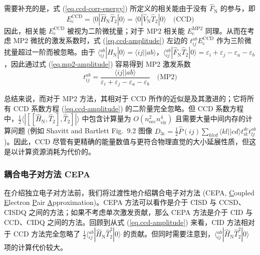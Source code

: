 \begin{itemize}[nosep]
  需要补充的是，式 (\ref{eq.ccd-corr-energy}) 所定义的相关能由于没有 $\hat F_\mathrm{N}$ 的参与，即
  \begin{equation*}
    E_\mathrm{c}^\mathrm{CCD} = \langle 0 | \hat H_\mathrm{N} \hat T_2 | 0 \rangle = \langle 0 | \hat V_\mathrm{N} \hat T_2 | 0 \rangle \quad \text{(CCD)}
  \end{equation*}
  因此，相关能 $E_\mathrm{c}^\mathrm{CCD}$ 被视为二阶微扰量；对于 MP2 相关能 $E_\mathrm{c}^\mathrm{MP2}$ 同理。从而在考虑 MP2 微扰的激发系数时，式 (\ref{eq.ccd-amplitude}) 左边的 $t_{ij}^{ab} E_\mathrm{c}^\mathrm{CCD}$ 作为三阶微扰量超过一阶而被忽略。由于 $\langle {}_{ij}^{ab} | \hat H_\mathrm{N} | 0 \rangle = \langle ij || ab \rangle$，$\langle {}_{ij}^{ab} | \hat F_\mathrm{N} \hat T_2 | 0 \rangle = \varepsilon_i + \varepsilon_j - \varepsilon_a - \varepsilon_b$，因此通过式 (\ref{eq.mp2-amplitude}) 容易得到 MP2 激发系数
  \begin{equation}
    t_{ij}^{ab} = \frac{\langle ij || ab \rangle}{\varepsilon_i + \varepsilon_j - \varepsilon_a - \varepsilon_b} \quad \text{(MP2)}
  \end{equation}
\end{itemize}

总结来说，而对于 MP2 方法，其相对于 CCD 所作的近似是及其激进的；它将所有 CCD 系数方程 (\ref{eq.ccd-amplitude}) 的二阶量完全忽略。但 CCD 系数方程中，$\frac{1}{2} \langle | [[\hat H_\mathrm{N}, \hat T_2], \hat T_2] | \rangle$ 中包含计算量为 $O(n_\mathrm{occ}^2 n_\mathrm{vir}^4)$ 且需要大量中间内存的计算问题 (例如 Shavitt and Bartlett\cite{Shavitt-Bartlett.Cambridge.2009} Fig.\ 9.2 图像 $D_\mathrm{3c} = \frac{1}{2} \hat P(ij) \sum_{klcd} \langle kl || cd \rangle t_{ik}^{dc} t_{lj}^{ab}$)。因此，CCD 尽管有更精确的能量数值与更符合物理直觉的大小延展性质，但这是以计算资源消耗为代价的。
  
\subsubsection{耦合电子对方法 CEPA}

在介绍独立电子对方法前，我们将过渡性地介绍耦合电子对方法 (CEPA, \underline{C}oupled \underline{E}lectron \underline{P}air \underline{A}pproximation)\cite{Ahlrichs-Ahlrichs.CPC.1979}。CEPA 方法可以看作是介于 CISD 与 CCSD、CISDQ 之间的方法；如果不考虑单次激发贡献，那么 CEPA 方法是介于 CID 与 CCD、CIDQ 之间的方法。回顾到从式 (\ref{eq.ccd-amplitude}) 来看，CID 方法相对于 CCD 方法完全忽略了 $\frac{1}{2} \langle {}_{ij}^{ab} | \hat H_\mathrm{N} \hat T_2^2 | 0 \rangle$ 的贡献。但同时需要注意到，$\langle {}_{ij}^{ab} | \hat H_\mathrm{N} \hat T_2^2 | 0 \rangle$ 项的计算代价较大。

